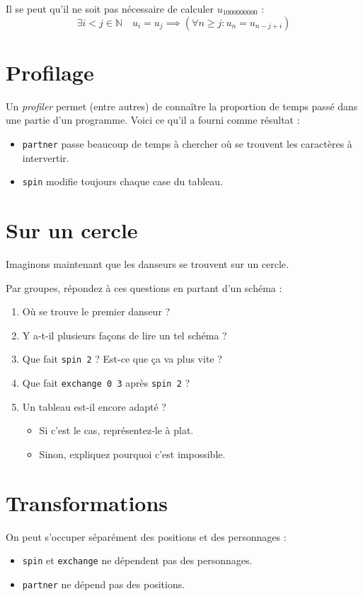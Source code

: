 \documentclass[11pt,a4paper,oneside]{book}
\begin{document}
Il se peut qu'il ne soit pas nécessaire de calculer $u_{1000000000}$ : \[
	\exists i<j \in \mathbb{N} \quad
	u_i=u_j \implies
	\left(\forall n \geq j : u_n=u_{n-j+i}\right)
\]

\section{Profilage}
Un \emph{profiler} permet (entre autres) de connaître la proportion de temps
passé dans une partie d'un programme. Voici ce qu'il a fourni comme résultat :
\begin{itemize}
\item \texttt{partner} passe beaucoup de temps à chercher où se trouvent les
	caractères à intervertir.
\item \texttt{spin} modifie toujours chaque case du tableau.
\end{itemize}

\section{Sur un cercle}
Imaginons maintenant que les danseurs se trouvent sur un cercle.

Par groupes, répondez à ces questions en partant d'un schéma :
\begin{enumerate}
\item Où se trouve le premier danseur ?
\item Y a-t-il plusieurs façons de lire un tel schéma ?
\item Que fait \texttt{spin 2} ? Est-ce que ça va plus vite ?
\item Que fait \texttt{exchange 0 3} après \texttt{spin 2} ?
\item Un tableau est-il encore adapté ?
	\begin{itemize}
	\item Si c'est le cas, représentez-le à plat.
	\item Sinon, expliquez pourquoi c'est impossible.
	\end{itemize}
\end{enumerate}


\section{Transformations}
On peut s'occuper séparément des positions et des personnages :
\begin{itemize}
	\item \texttt{spin} et \texttt{exchange} ne dépendent pas des personnages.
	\item \texttt{partner} ne dépend pas des positions.
\end{itemize}
\end{document}
